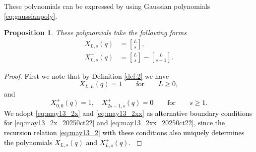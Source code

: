 \documentclass[sn-mathphys-num]{sn-jnl}%
\newcommand{\red}[1]{\textcolor{black}{#1}}
\theoremstyle{thmstyleone}%
\newtheorem{proposition}[theorem]{Proposition}%
\theoremstyle{thmstyletwo}%
\theoremstyle{thmstylethree}%
\begin{document}
These polynomials can be expressed by using Gaussian polynomials \eqref{eq:gaussianpoly}.



\begin{proposition}\label{prop:6}
These polynomials take the following forms
\begin{align}
X_{L,s}(q) &=
{ L \brack s }, \label{eq:may14_8}\\
%
X^+_{L,s}(q) &=
{ L \brack s }- { L \brack s-1}. \label{eq:may17_1}
\end{align}
\end{proposition}
\begin{proof}
\red{
First we note that by Definition \ref{def:2} we have
\begin{equation} \label{eq:may13_2x}
X_{L,L}(q) = 1 \qquad \mbox{for} \qquad L \geq 0, 
\end{equation}
and 
\begin{equation} \label{eq:may13_2xx}
X^+_{0,0}(q) =1, \quad X^+_{2s-1,s}(q) = 0 \qquad \mbox{for} \qquad s \geq 1.
\end{equation}
We adopt \eqref{eq:may13_2x} and \eqref{eq:may13_2xx} as alternative
boundary conditions for \eqref{eq:may13_2x_20250ct22} and \eqref{eq:may13_2xx_20250ct22}, since
the recursion relation \eqref{eq:may13_2} with these conditions
also uniquely determines the polynomials $X_{L,s}(q)$ and $X^+_{L,s}(q)$. }


\end{proof}
\end{document}

